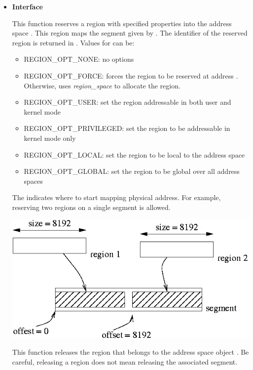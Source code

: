 \begin{itemize}
  \item {\bf Interface}\\
	 {
	   This function reserves a region with specified properties
	   into the address space . This region maps the
	   segment given by . The identifier of the reserved region is returned in . Values for  can be:

	   \begin{itemize}
	     \item {REGION\_OPT\_NONE}: no options
	     \item {REGION\_OPT\_FORCE}: forces the region to be reserved at address . Otherwise, uses \emph{region\_space} to allocate the region.
	     \item {REGION\_OPT\_USER}: set the region addressable in both user and kernel mode
	     \item {REGION\_OPT\_PRIVILEGED}: set the region to be addressable in kernel mode only
	     \item {REGION\_OPT\_LOCAL}: set the region to be local to the address space
	     \item {REGION\_OPT\_GLOBAL}: set the region to be global over all address spaces
	   \end{itemize}
	   The  indicates where to start mapping
	   physical address. For example, reserving two regions on a
	   single segment is allowed.
	   \begin{center}
	     \includegraphics[width=0.4\linewidth]{figures/offset}
	   \end{center}
	 }

	 {
	   This function releases the region  that
	   belongs to the address space object . Be
	   careful, releasing a region does not mean releasing the
	   associated segment.
	 }


\end{itemize}
